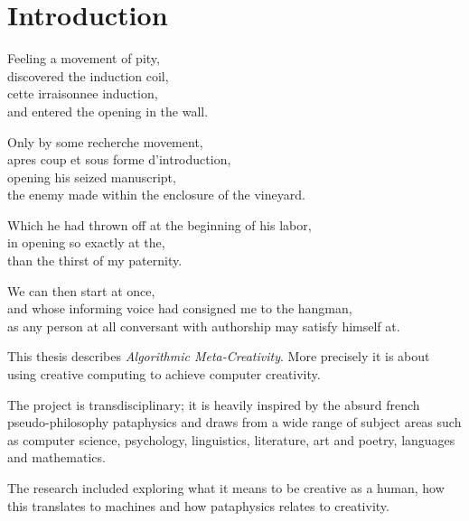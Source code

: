 
\chapter{Introduction}
\label{ch:introduction}

\startcontents[chapters]

\vfill

Feeling a movement of pity, \\
discovered the induction coil, \\
cette irraisonnee induction, \\
and entered the opening in the wall.

Only by some recherche movement, \\
apres coup et sous forme d'introduction, \\
opening his seized manuscript, \\
the enemy made within the enclosure of the vineyard.

Which he had thrown off at the beginning of his labor, \\
in opening so exactly at the, \\
than the thirst of my paternity.

We can then start at once, \\
and whose informing voice had consigned me to the hangman, \\
as any person at all conversant with authorship may satisfy himself at.

\newpage
\minicontents
\spirals

This thesis describes \textit{Algorithmic Meta-Creativity}. More precisely it is about using creative computing to achieve computer creativity.

The project is transdisciplinary; it is heavily inspired by the absurd french pseudo-philosophy pataphysics and draws from a wide range of subject areas such as computer science, psychology, linguistics, literature, art and poetry, languages and mathematics.

The research included exploring what it means to be creative as a human, how this translates to machines and how pataphysics relates to creativity.

\begin{draft}
  
\end{draft}

